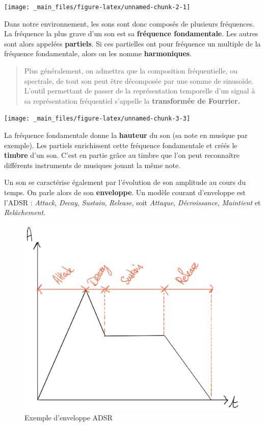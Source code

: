 \documentclass[
]{book}
\begin{document}
\begin{center}\texttt{[image: \_main\_files/figure-latex/unnamed-chunk-2-1]} \end{center}

Dans notre environnement, les sons sont donc composés de plusieurs fréquences. La fréquence la plus grave d'un son est sa \textbf{fréquence fondamentale}. Les autres sont alors appelées \textbf{partiels}. Si ces partielles ont pour fréquence un multiple de la fréquence fondamentale, alors on les nomme \textbf{harmoniques}.

\begin{quote}
Plus généralement, on admettra que la composition fréquentielle, ou spectrale, de tout son peut être décomposée par une somme de sinusoïde. L'outil permettant de passer de la représentation temporelle d'un signal à sa représentation fréquentiel s'appelle la \textbf{transformée de Fourrier.}
\end{quote}

\begin{center}\texttt{[image: \_main\_files/figure-latex/unnamed-chunk-3-3]} \end{center}

La fréquence fondamentale donne la \textbf{hauteur} du son (sa note en musique par exemple). Les partiels enrichissent cette fréquence fondamentale et créés le \textbf{timbre} d'un son. C'est en partie grâce au timbre que l'on peut reconnaître différents instruments de musiques jouant la même note.

Un son se caractérise également par l'évolution de son amplitude au cours du temps. On parle alors de son \textbf{enveloppe}. Un modèle courant d'enveloppe est l'ADSR : \emph{Attack}, \emph{Decay}, \emph{Sustain}, \emph{Release}, soit \emph{Attaque}, \emph{Décroissance}, \emph{Maintient} et \emph{Relâchement}.

\begin{figure}

{\centering \includegraphics[width=0.65\linewidth]{_resources/drawings/adsr} 

}

\caption{Exemple d'enveloppe ADSR}\label{fig:unnamed-chunk-4}
\end{figure}
\end{document}

